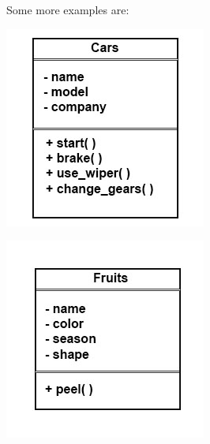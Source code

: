 \documentclass[11pt]{article}
\begin{document}
Some more examples are:
\begin{center}
\includegraphics[width=.9\linewidth]{./img/cars_uml.jpg}
\end{center} \begin{center}
\includegraphics[width=.9\linewidth]{./img/fruits_uml.jpg}
\end{center}
\end{document}
